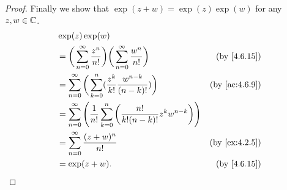 \begin{proof}
  Finally we show that \(\exp(z + w) = \exp(z) \exp(w)\) for any \(z, w \in \mathbb{C}\).
  \begin{align*}
     & \exp(z) \exp(w)                                                                                                                              \\
     & = \bigg(\sum_{n = 0}^\infty \frac{z^n}{n!}\bigg) \bigg(\sum_{n = 0}^\infty \frac{w^n}{n!}\bigg)                & \text{(by \cref{4.6.15})}   \\
     & = \sum_{n = 0}^\infty \bigg(\sum_{k = 0}^n (\frac{z^k}{k!} \frac{w^{n - k}}{(n - k)!})\bigg)                   & \text{(by \cref{ac:4.6.9})} \\
     & = \sum_{n = 0}^\infty \Bigg(\frac{1}{n!} \sum_{k = 0}^n \bigg(\frac{n!}{k! (n - k)!} z^k w^{n - k}\bigg)\Bigg)                               \\
     & = \sum_{n = 0}^\infty \frac{(z + w)^n}{n!}                                                                     & \text{(by \cref{ex:4.2.5})} \\
     & = \exp(z + w).                                                                                                 & \text{(by \cref{4.6.15})}
  \end{align*}
\end{proof}